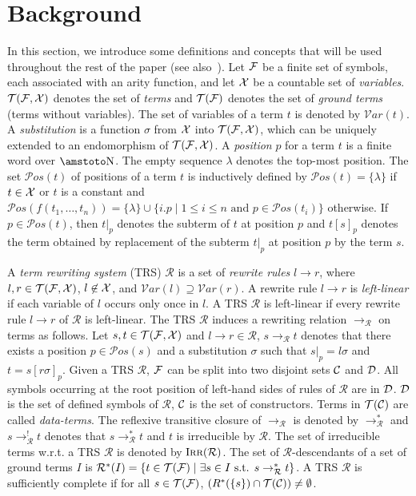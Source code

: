 \documentclass[a4paper,11pt]{llncs}
\def \R {\mathcal{R}}
\newcommand{\desc}{\R^*}
\newcommand{\F}{{\cal F}}
\newcommand{\X}{{\cal X}}
\newcommand{\C}{{\cal C}}
\newcommand{\D}{{\cal D}}
\newcommand{\TF}{{\cal T(F)}}
\newcommand{\TFX}{{\cal T(F, X)}}
\newcommand{\TC}{{\cal T(C)}}
\newcommand{\et}{\mbox{ and }}
\newcommand{\sth}{\mbox{ s.t. }}
\DeclareMathOperator{\lirr}{I\textsc{rr}}
\newcommand{\rw}{\rightarrow}
\newcommand{\pos}{{\mathcal Pos}}
\newcommand{\var}{{\mathcal Var}}
\newcommand{\NN}{\mbox{\amstoto\char'116}}
\newcommand{\sep}{\; | \;}
\theoremstyle{plain}
\begin{document}
\section{Background}
\label{sec:bg}

In this section, we introduce some definitions and concepts that will
be used throughout the rest of the paper (see
also~\cite{BaaderN-book98,TATA}). Let $\F$ be a
finite set of symbols, each associated with an arity function, and let
$\X$ be a countable set of {\em variables}. $\TFX$ denotes the set of
{\em terms} and $\TF$ denotes the set of {\em ground terms} (terms
without variables). The set of variables of a term $t$ is denoted by
$\var(t)$. A {\em substitution} is a function $\sigma$ from $\X$ into
$\TFX$, which can be uniquely extended to an endomorphism of $\TFX$. A
{\em position} $p$ for a term $t$ is a finite word over $\NN$. The empty
sequence $\lambda$ denotes the top-most position. The set $\pos(t)$ of
positions of a term $t$ is inductively defined by $\pos(t)= \{
\lambda\} $ if $t \in \X$ or $t$ is a constant and $\pos(f(t_1,\dots,t_n)) = \{ \lambda \}
\cup \{i.p \mid 1 \leq i \leq n \et p \in \pos(t_i) \}$ otherwise.  If
$p \in \pos(t)$, then $t|_p$ denotes the subterm of $t$ at position
$p$ and $t[s]_p$ denotes the term obtained by replacement of the
subterm $t|_p$ at position $p$ by the term $s$.


A {\em term rewriting system} (TRS) $\R$ is a set of {\em rewrite
  rules} $l \rw r$, where $l, r \in \TFX$, $l \not \in \X$, and
$\var(l) \supseteq \var(r)$.  A rewrite rule $l \rw r$ is {\em
  left-linear} if each variable of $l$ occurs only once in $l$.  A TRS $\R$ is left-linear if
every rewrite rule $l \rw r$ of $\R$ is left-linear.  The TRS
$\R$ induces a rewriting relation $\rw_{\R}$ on terms as follows. Let
$s, t\in \TFX$ and $l \rw r \in \R$, $s \rw_{\R} t$ denotes that there
exists a position $p\in\pos(s)$ and a substitution $\sigma$ such that
$s|_p= l\sigma$ and $t=s[r\sigma]_p$.
Given a TRS $\R$, $\F$ can be split into two disjoint sets $\C$ and $\D$. All symbols
occurring at the root position of left-hand sides of rules of $\R$ are in
$\D$. $\D$ is the set of defined symbols of $\R$, $\C$ is the set of
constructors. Terms in $\TC$ are called {\em data-terms}.  
The reflexive transitive closure of $\rw_{\R}$ is denoted by
$\rw^*_{\R}$ and $s \rw^!_\R t$ denotes that $s\rw^*_\R t$ and $t$ is
irreducible by $\R$. The set of irreducible terms w.r.t. a TRS $\R$ is denoted
by $\lirr(\R)$.
The set of $\R$-descendants of a set of ground
terms $I$ is $\desc(I) = \{t \in \TF \sep \exists s \in I \sth s
\rw^*_{\R} t \}$.  
A TRS $\R$ is sufficiently complete if for all
$s\in\TF$,
$(R^*(\{s\})\cap\TC)\neq\emptyset$. 
\end{document}
